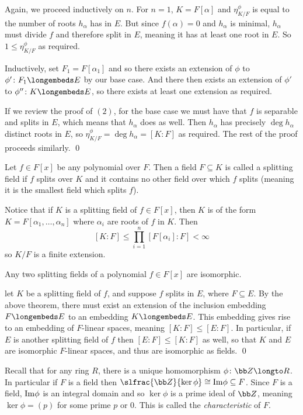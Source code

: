     \item Again, we proceed inductively on $n$.
    For $n=1$, $K=F[\alpha]$ and $\eta_{K/F}^\phi$ is equal to the number of roots $h_\alpha$ has in $E$.
    But since $f(\alpha)=0$ and $h_\alpha$ is minimal, $h_\alpha$ must divide $f$ and therefore split in $E$, meaning it has at least one root in $E$.
    So $1\leq\eta^\phi_{K/F}$ as required.

    Inductively, set $F_1=F[\alpha_1]$ and so there exists an extension of $\phi$ to $\phi'\colon F_1\longembeds E$ by our base case.
    And there then exists an extension of $\phi'$ to $\phi''\colon K\longembeds E$, so there exists at least one extension as required.

    \item If we review the proof of $(2)$, for the base case we must have that $f$ is separable and splits in $E$, which means that $h_\alpha$ does as well.
    Then $h_\alpha$ has precisely $\deg h_\alpha$ distinct roots in $E$, so $\eta^\phi_{K/F}=\deg h_\alpha=[K:F]$ as required.
    The rest of the proof proceeds similarly.
    \qed
\eenum
\egroup

\bdefn

    Let $f\in F[x]$ be any polynomial over $F$.
    Then a field $F\subseteq K$ is called a {\emphcolor splitting field} if $f$ splits over $K$ and it contains no other field over which $f$ splits (meaning it is the smallest field which splits $f$).

\edefn

Notice that if $K$ is a splitting field of $f\in F[x]$, then $K$ is of the form $K=F[\alpha_1,\dots,\alpha_n]$ where $\alpha_i$ are roots of $f$ in $K$.
Then
$$ [K:F] \leq \prod_{i=1}^n[F[\alpha_i]:F] < \infty $$
so $K/F$ is a finite extension.

\bthrm

    Any two splitting fields of a polynomial $f\in F[x]$ are isomorphic.

\ethrm

\Proof let $K$ be a splitting field of $f$, and suppose $f$ splits in $E$, where $F\subseteq E$.
By the above theorem, there must exist an extension of the inclusion embedding $F\longembeds E$ to an embedding $K\longembeds E$.
This embedding gives rise to an embedding of $F$-linear spaces, meaning $[K:F]\leq[E:F]$.
In particular, if $E$ is another splitting field of $f$ then $[E:F]\leq[K:F]$ as well, so that $K$ and $E$ are isomorphic $F$-linear spaces, and thus are isomorphic as fields.
\qed

Recall that for any ring $R$, there is a unique homomorphism $\phi\colon{\bb Z}\longto R$.
In particular if $F$ is a field then $\slfrac{\bb Z}{\ker\phi}\cong{\rm Im}\phi\subseteq F$.
Since $F$ is a field, ${\rm Im}\phi$ is an integral domain and so $\ker\phi$ is a prime ideal of ${\bb Z}$, meaning $\ker\phi=(p)$ for some prime $p$ or $0$.
This is called the {\it characteristic} of $F$.

